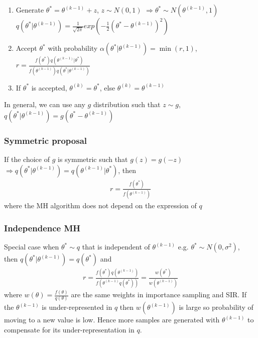       \begin{enumerate}
          \item Generate $\theta^* = \theta^{(k-1)}+z$,
              $z\sim N(0, 1)$ $\Rightarrow \theta^* \sim
              N(\theta^{(k-1)}, 1)$
              \subitem $q(\theta^*|\theta^{(k-1)})=
              \frac{1}{\sqrt{2\pi}}
              exp(-\frac{1}{2}(\theta^* - \theta^{(k-1)})^2)$
          \item Accept $\theta^*$ with probability
              $\alpha(\theta^*|\theta^{(k-1)}) = \min(r, 1)$,
              $r =
              \frac{f(\theta^*) q(\theta^{(k-1)}|\theta^*)}
              {f(\theta^{(k-1)}) q(\theta^*|\theta^{(k-1)})}$
          \item If $\theta^*$ is accepted,
              $\theta^{(k)}=\theta^*$, else
              $\theta^{(k)}=\theta^{(k-1)}$
      \end{enumerate}

      In general, we can use any $g$ distribution such that
      $z\sim g$, $q(\theta^*|\theta^{(k-1)}) = g(\theta^* -
      \theta^{(k-1)})$

      \subsubsection{Symmetric proposal}

      If the choice of $g$ is symmetric such that $g(z) =
      g(-z)$ $\Rightarrow q(\theta^*|\theta^{(k-1)})
      =q(\theta^{(k-1)}|\theta^*)$, then
      \begin{align*}
          r = \frac{f(\theta^*)}{f(\theta^{(k-1)})}
      \end{align*}
      where the MH algorithm does not depend on the
      expression of $q$

      \subsubsection{Independence MH}

      Special case when $\theta^*\sim q$ that is independent
      of $\theta^{(k-1)}$ e.g. $\theta^*\sim N(0,
      \sigma^2)$,\\
      then $q(\theta^*|\theta^{(k-1)})=q(\theta^*)$ and
      \begin{align*}
          r = \frac{f(\theta^*)q(\theta^{(k-1)})}
          {f(\theta^{(k-1)}q(\theta^*))}=
          \frac{w(\theta^*)}{w(\theta^{(k-1)})}
      \end{align*}
      where $w(\theta) = \frac{f(\theta)}{q(\theta)}$ are the same
      weights in importance sampling and SIR. If the
      $\theta^{(k-1)}$ is under-represented in $q$ then
      $w(\theta^{(k-1)})$ is large so probability of moving
      to a new value is low. Hence more samples are
      generated with $\theta^{(k-1)}$ to compensate for its
      under-representation in $q$.

